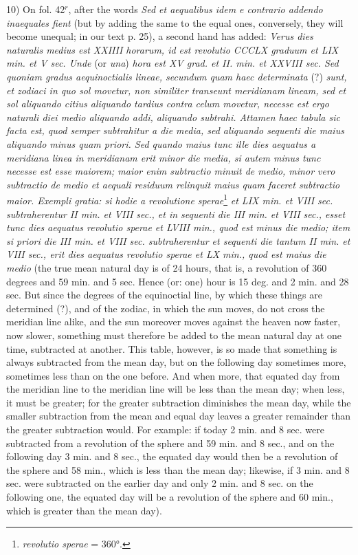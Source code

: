 \documentclass[11pt]{article}
\begin{document}
\par 10) On fol. 42$^{r}$, after the words \emph{Sed et aequalibus idem e contrario addendo inaequales fient} (but by adding the same to the equal ones, conversely, they will become unequal; in our text p. 25), a second hand has added: \emph{Verus dies naturalis medius est XXIIII horarum, id est revolutio CCCLX graduum et LIX min. et V sec. Unde} (or \emph{una}) \emph{hora est XV grad. et II. min. et XXVIII sec. Sed quoniam gradus aequinoctialis lineae, secundum quam haec determinata} (?) \emph{sunt, et zodiaci in quo sol movetur, non similiter transeunt meridianam lineam, sed et sol aliquando citius aliquando tardius contra celum movetur, necesse est ergo naturali diei medio aliquando addi, aliquando subtrahi. Attamen haec tabula sic facta est, quod semper subtrahitur a die media, sed aliquando sequenti die maius aliquando minus quam priori. Sed quando maius tunc ille dies aequatus a meridiana linea in meridianam erit minor die media, si autem minus tunc necesse est esse maiorem; maior enim subtractio minuit de medio, minor vero subtractio de medio et aequali residuum relinquit maius quam faceret subtractio maior. Exempli gratia: si hodie a revolutione sperae}\footnote{\emph{revolutio sperae} = 360°.} \emph{et LIX min. et VIII sec. subtraherentur II min. et VIII sec., et in sequenti die III min. et VIII sec., esset tunc dies aequatus revolutio sperae et LVIII min., quod est minus die medio; item si priori die III min. et VIII sec. subtraherentur et sequenti die tantum II min. et VIII sec., erit dies aequatus revolutio sperae et LX min., quod est maius die medio} (the true mean natural day is of 24 hours, that is, a revolution of 360 degrees and 59 min. and 5 sec. Hence (or: one) hour is 15 deg. and 2 min. and 28 sec. But since the degrees of the equinoctial line, by which these things are determined (?), and of the zodiac, in which the sun moves, do not cross the meridian line alike, and the sun moreover moves against the heaven now faster, now slower, something must therefore be added to the mean natural day at one time, subtracted at another. This table, however, is so made that something is always subtracted from the mean day, but on the following day sometimes more, sometimes less than on the one before. And when more, that equated day from the meridian line to the meridian line will be less than the mean day; when less, it must be greater; for the greater subtraction diminishes the mean day, while the smaller subtraction from the mean and equal day leaves a greater remainder than the greater subtraction would. For example: if today 2 min. and 8 sec. were subtracted from a revolution of the sphere and 59 min. and 8 sec., and on the following day 3 min. and 8 sec., the equated day would then be a revolution of the sphere and 58 min., which is less than the mean day; likewise, if 3 min. and 8 sec. were subtracted on the earlier day and only 2 min. and 8 sec. on the following one, the equated day will be a revolution of the sphere and 60 min., which is greater than the mean day).\par
\end{document}
